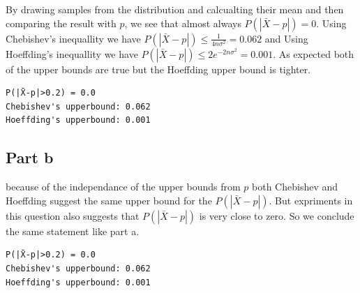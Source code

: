 \documentclass[12pt, a4paper]{book}
\begin{document}
By drawing samples from the distribution and calcualting their mean and then
comparing the result with $p$, we see that almost always $P(|\bar{X} - p|) = 0$.
Using Chebishev's inequallity we have $P(|\bar{X} - p|) \le \frac{1}{4n\sigma^2} = 0.062$ and
Using Hoeffding's inequallity we have $P(|\bar{X} - p|) \le 2e^{-2n\sigma^2} = 0.001$. As expected
both of the upper bounds are true but the Hoeffding upper bound is tighter.

\begin{mdframed}
\begin{verbatim}
P(|X̄-p|>0.2) = 0.0
Chebishev's upperbound: 0.062
Hoeffding's upperbound: 0.001
\end{verbatim}
\end{mdframed}

\subsection*{Part b}

because of the independance of the upper bounds from $p$ both Chebishev and Hoeffding
suggest the same upper bound for the $P(|\bar{X}-p|)$. But expriments in this question also
suggests that $P(|\bar{X}-p|)$ is very close to zero. So we conclude the same statement like part a.

\begin{mdframed}
\begin{verbatim}
P(|X̄-p|>0.2) = 0.0
Chebishev's upperbound: 0.062
Hoeffding's upperbound: 0.001
\end{verbatim}
\end{mdframed}
\end{document}
